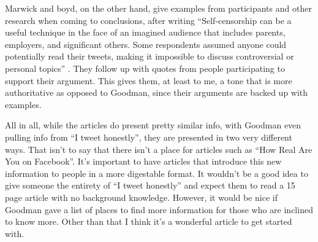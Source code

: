 \documentclass[12pt]{article}
\begin{document}
\begin{doublespace}
        Marwick and boyd, on the other hand, give examples from participants and other research when coming to conclusions, after writing
        ``Self-censorship can be a useful technique in the face of an imagined audience that includes parents, employers, and significant others. Some respondents assumed anyone could potentially read their tweets, making it impossible to discuss controversial or personal topics'' \autocite*[125]{tweet}.
        They follow up with quotes from people participating to support their argument. This gives them, at least to me, a tone that is more authoritative as opposed to Goodman, since their arguments are backed up with examples.
    \par%
        All in all, while the articles do present pretty similar info, with Goodman even pulling info from ``I tweet honestly'', they are presented in two very different ways. That isn't to say that there isn't a place for articles such as ``How Real Are You on Facebook''.
        It's important to have articles that introduce this new information to people in a more digestable format. It wouldn't be a good idea to give someone the entirety of ``I tweet honestly'' and expect them to read a 15 page article with no background knowledge.
        However, it would be nice if Goodman gave a list of places to find more information for those who are inclined to know more. Other than that I think it's a wonderful article to get started with.
    \newpage \printbibliography


    \end{doublespace}
\end{document}

